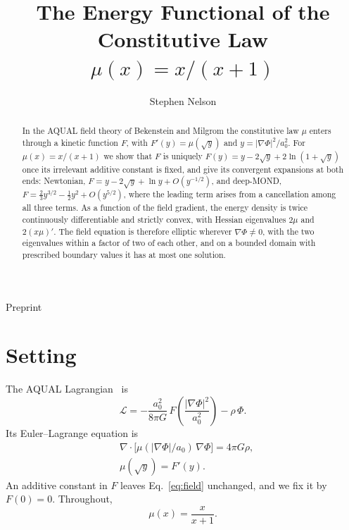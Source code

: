 \documentclass[twocolumn]{iopjournal}
\renewcommand{\articletype}[1]{%
  {\vspace*{-8mm}\noindent \Large \sf Preprint}\par
  \vspace*{6mm}\noindent{\scriptsize \sf{\bfseries \MakeUppercase{#1}}}}
\begin{document}
\articletype{Supplementary Material}

\title{The Energy Functional of the\\
Constitutive Law $\mu(x) = x/(x+1)$}

\author{Stephen Nelson}



\begin{abstract}
In the AQUAL field theory of Bekenstein and Milgrom the constitutive
law $\mu$ enters through a kinetic function $F$, with
$F'(y) = \mu(\sqrt y)$ and $y = |\nabla\Phi|^2/a_0^2$. For
$\mu(x) = x/(x+1)$ we show that $F$ is uniquely
$F(y) = y - 2\sqrt y + 2\ln(1 + \sqrt y)$ once its irrelevant
additive constant is fixed, and give its convergent expansions at
both ends: Newtonian, $F = y - 2\sqrt y + \ln y + O(y^{-1/2})$, and
deep-MOND, $F = \tfrac23 y^{3/2} - \tfrac12 y^2 + O(y^{5/2})$,
where the leading term arises from a cancellation among all three
terms. As a function of the field gradient, the energy density is
twice continuously differentiable and strictly convex, with Hessian
eigenvalues $2\mu$ and $2(x\mu)'$. The field equation is therefore
elliptic wherever $\nabla\Phi \neq 0$, with the two eigenvalues
within a factor of two of each other, and on a bounded domain with
prescribed boundary values it has at most one solution.
\end{abstract}



\section*{Setting}

The AQUAL Lagrangian~\cite{BekensteinMilgrom1984} is
\begin{equation}
  \mathcal{L} = -\frac{a_0^2}{8\pi G}\,
  F\!\left(\frac{|\nabla\Phi|^2}{a_0^2}\right) - \rho\,\Phi .
  \label{eq:L}
\end{equation}
Its Euler--Lagrange equation is
\begin{equation}
\begin{aligned}
  &\nabla\cdot\big[\mu(|\nabla\Phi|/a_0)\,\nabla\Phi\big]
  = 4\pi G\rho, \\
  &\mu(\sqrt y) = F'(y).
\end{aligned}
  \label{eq:field}
\end{equation}
An additive constant in $F$ leaves Eq.~\eqref{eq:field} unchanged,
and we fix it by $F(0) = 0$. Throughout,
\begin{equation}
  \mu(x) = \frac{x}{x+1}.
  \label{eq:mu}
\end{equation}
\end{document}

